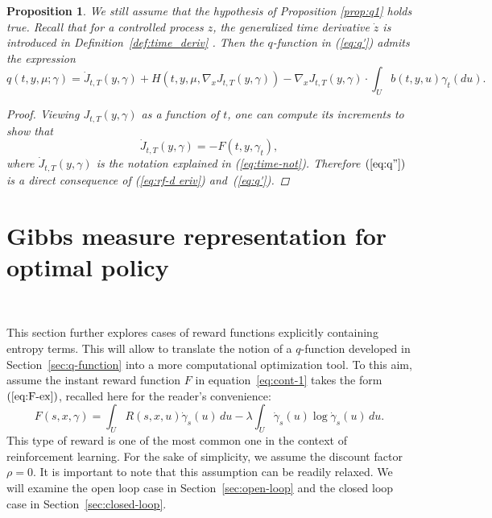 \documentclass[12pt,reqno]{amsart}
\numberwithin{equation}{section}  %
\newcommand{\1}{{\bf 1}}
\newcommand{\2}{{\bf 2}}
\newcommand{\ga}{\gamma}
\newtheorem{proposition}[theorem]{Proposition}
\theoremstyle{remark}
\theoremstyle{remark}
\begin{document}
\begin{proposition} \label{prop:qfunc}
     We still assume that the hypothesis of Proposition \ref{prop:q1} holds true. Recall that for a controlled process $z$, the generalized time derivative $\dot{z}$ is introduced in Definition~\ref{def:time_deriv} . Then the $q$-function in (\ref{eq:q'}) admits the expression
     \begin{equation}\label{eq:q''}
         q(t,y,\mu;\ga)=\dot{J}_{t,T}(y,\ga)+H(t,y,\mu,\nabla_{x}J_{t,T}(y,\ga))-{\nabla_{x}J_{t,T}(y,\ga)\cdot \int_{U}b(t,y,u)\ga_{t}(du)}.
     \end{equation}
     \begin{proof}
     Viewing $J_{t,T}(y,\ga)$ as a function of $t$, one can compute its increments to show that 
\begin{equation}
   \label{eq:rf-d eriv} \dot{J}_{t,T}(y,\ga)=-F(t,y,\ga_{t}),
\end{equation}
where $\dot{J}_{t,T}(y,\ga)$ is the notation explained in (\ref{eq:time-not}). 
        Therefore $(\ref{eq:q''})$ is a direct consequence of (\ref{eq:rf-d eriv}) and~(\ref{eq:q'}).
\end{proof}
\end{proposition}

\section{Gibbs measure representation for optimal policy}~\label{sec:gibbs}

This section further explores cases of reward
functions explicitly containing entropy terms.
This will allow to translate the notion of a $q$-function developed in Section~\ref{sec:q-function} into a more computational optimization tool. To this aim, assume the instant reward function $F$ in equation~\eqref{eq:cont-1} takes the form {$(\ref{eq:F-ex})$}, recalled here for the reader's convenience:
\begin{equation}\label{eq: ConvF}
    F(s,x,\ga)=\int_{U}R(s,x,u)\dot{\ga}_{s}(u)\,du-\lambda\int_{U}\dot{\ga}_{s}(u)\log \dot{\ga}_{s}(u)\,du.
\end{equation}
This type of reward is one of the most common one in the context of reinforcement learning. For the sake of simplicity, we assume the discount factor $\rho = 0$. It is important to note that this assumption can be readily relaxed. We will examine the open loop case in Section~\ref{sec:open-loop} and the closed loop case in Section~\ref{sec:closed-loop}.
\end{document}
